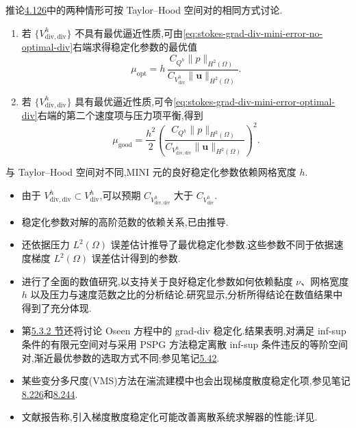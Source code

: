 \begin{note}\label{note:stokes-grad-div-mini-parameter-choice}
推论\hyperref[cor:stokes-grad-div-mini-error]{4.126}中的两种情形可按 Taylor--Hood 空间对的相同方式讨论.
\begin{enumerate}[label=\roman*)]
  \item 若 $\{V_{\mathrm{div,div}}^h\}$ 不具有最优逼近性质,可由\cref{eq:stokes-grad-div-mini-error-no-optimal-div}右端求得稳定化参数的最优值
  \[
   \mu_{\mathrm{opt}}
   =h\,\frac{C_{Q^h}\|p\|_{H^2(\Omega)}}
             {C_{V_{\mathrm{div}}^h}\|\bm{u}\|_{H^2(\Omega)}}.
  \]
  \item 若 $\{V_{\mathrm{div,div}}^h\}$ 具有最优逼近性质,可令\cref{eq:stokes-grad-div-mini-error-optimal-div}右端的第二个速度项与压力项平衡,得到
  \[
   \mu_{\mathrm{good}}
   =\frac{h^2}{2}
      \left(\frac{C_{Q^h}\|p\|_{H^2(\Omega)}}
      {C_{V_{\mathrm{div,div}}^h}\|\bm{u}\|_{H^2(\Omega)}}\right)^2.
  \]
\end{enumerate}
与 Taylor--Hood 空间对不同,MINI 元的良好稳定化参数依赖网格宽度 $h$.
\end{note}

\begin{note}[关于梯度散度稳定化]\label{note:stokes-grad-div-general-remarks}
\begin{itemize}
  \item 由于 $V_{\mathrm{div,div}}^h\subset V_{\mathrm{div}}^h$,可以预期 $C_{V_{\mathrm{div,div}}^h}$ 大于 $C_{V_{\mathrm{div}}^h}$.
  \item 稳定化参数对解的高阶范数的依赖关系,已由\textcite{OlshanskiiLubeHeisterLowe2009,HeisterRapin2013,JenkinsJohnLinkeRebholz2014}推导.
  \item \textcite{JenkinsJohnLinkeRebholz2014}还依据压力 $L^2(\Omega)$ 误差估计推导了最优稳定化参数.这些参数不同于依据速度梯度 $L^2(\Omega)$ 误差估计得到的参数.
  \item \textcite{JenkinsJohnLinkeRebholz2014}进行了全面的数值研究,以支持关于良好稳定化参数如何依赖黏度 $\nu$、网格宽度 $h$ 以及压力与速度范数之比的分析结论.研究显示,分析所得结论在数值结果中得到了充分体现.
  \item 第\hyperref[subsec:oseen-spg-stabilization]{5.3.2 节}还将讨论 Oseen 方程中的 grad-div 稳定化.结果表明,对满足 inf-sup 条件的有限元空间对与采用 PSPG 方法稳定离散 inf-sup 条件违反的等阶空间对,渐近最优参数的选取方式不同;参见笔记\hyperref[note:oseen-optimal-stabilization]{5.42}.
  \item 某些变分多尺度(VMS)方法在湍流建模中也会出现梯度散度稳定化项,参见笔记\hyperref[note:vms-grad-div-stabilization]{8.226}和\hyperref[note:vms-grad-div-second]{8.244}.
  \item 文献报告称,引入梯度散度稳定化可能改善离散系统求解器的性能;详见\textcite{GlowinskiLeTallec1989,VassilevskiLazarov1996,BychenkovChizonkov1999,HeisterRapin2013}.
\end{itemize}
\end{note}

